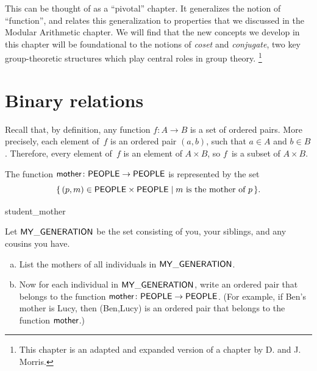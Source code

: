 


\newcommand{\class}[1]{\overline{#1}}
\newcommand{\divides}{\mbox{|}}

\medskip\noindent

This can be thought of as a ``pivotal'' chapter. It generalizes the notion of ``function'', and relates this generalization to properties that we discussed in the Modular Arithmetic chapter. We will find that the new concepts we develop in this chapter will be foundational to the notions of \emph{coset} and \emph{conjugate}, two key group-theoretic structures which play central roles in group theory.
\footnote{This chapter  is an adapted and expanded version of a chapter by D. and J. Morris.}

\section{Binary relations} \label{sec.relation}


 Recall that, by definition, any function $f \colon A \to B$ is a set of ordered pairs. More precisely, each element of~$f$ is an ordered pair $(a,b)$, such that $a \in A$ and $b \in B$. Therefore, every element of~$f$ is an element of $A \times B$, so $f$~is a subset of $A \times B$.


\begin{eg} 
The function $\sf{mother} \colon \sf{PEOPLE} \to \sf{PEOPLE}$ is represented by the set
	$$ \{\, (p,m) \in  \sf{PEOPLE} \times \sf{PEOPLE} \mid \text{$m$ is the mother of~$p$} \,\} .$$
\end{eg}

\begin{exercise}{student_mother}

\noindent
Let $\sf{MY\_GENERATION}$ be the set consisting  of you, your siblings, and any cousins you have.  
\begin{enumerate}[(a)]
\item
List the mothers of all individuals in $\sf{MY\_GENERATION}$.
\item
Now for each individual in $\sf{MY\_GENERATION}$, write an ordered pair that belongs to the function $\sf{mother} \colon \sf{PEOPLE} \to \sf{PEOPLE}$. (For example, if Ben's  mother is Lucy, then (Ben,Lucy) is an ordered pair that belongs to the function $\sf{mother}$.)
\end{enumerate}
\end{exercise}


